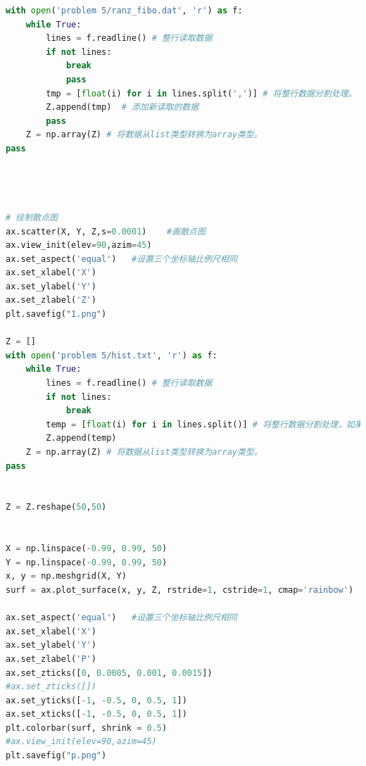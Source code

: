 \documentclass[a4paper,11pt]{article}
\begin{document}
\begin{appendices}
\begin{lstlisting}[language = python]
with open('problem 5/ranz_fibo.dat', 'r') as f:
    while True:
        lines = f.readline() # 整行读取数据
        if not lines:
            break
            pass
        tmp = [float(i) for i in lines.split(',')] # 将整行数据分割处理。
        Z.append(tmp)  # 添加新读取的数据
        pass
    Z = np.array(Z) # 将数据从list类型转换为array类型。
pass
    
       


# 绘制散点图
ax.scatter(X, Y, Z,s=0.0001)    #画散点图
ax.view_init(elev=90,azim=45)
ax.set_aspect('equal')   #设置三个坐标轴比例尺相同
ax.set_xlabel('X')
ax.set_ylabel('Y')
ax.set_zlabel('Z')
plt.savefig("1.png")

Z = []
with open('problem 5/hist.txt', 'r') as f:
    while True:
        lines = f.readline() # 整行读取数据
        if not lines:
            break
        temp = [float(i) for i in lines.split()] # 将整行数据分割处理，如果分割符是空格，括号里就不用传入参数，如果是逗号， 则传入‘，'字符。
        Z.append(temp)
    Z = np.array(Z) # 将数据从list类型转换为array类型。
pass


Z = Z.reshape(50,50)


X = np.linspace(-0.99, 0.99, 50)
Y = np.linspace(-0.99, 0.99, 50)
x, y = np.meshgrid(X, Y)
surf = ax.plot_surface(x, y, Z, rstride=1, cstride=1, cmap='rainbow')

ax.set_aspect('equal')   #设置三个坐标轴比例尺相同
ax.set_xlabel('X')
ax.set_ylabel('Y')
ax.set_zlabel('P')
ax.set_zticks([0, 0.0005, 0.001, 0.0015])
#ax.set_zticks([])
ax.set_yticks([-1, -0.5, 0, 0.5, 1])
ax.set_xticks([-1, -0.5, 0, 0.5, 1])
plt.colorbar(surf, shrink = 0.5)
#ax.view_init(elev=90,azim=45)
plt.savefig("p.png")	


\end{lstlisting}


\end{appendices}
\end{document}
